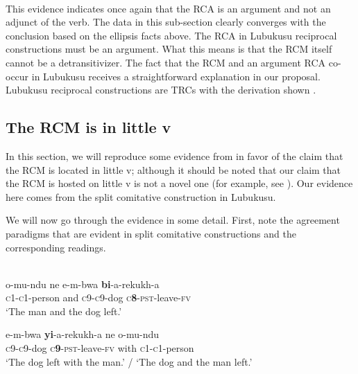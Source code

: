 \documentclass[output=paper]{langsci/langscibook}
\begin{document}
\ea\label{ex:safir:19}
\settowidth{}
  \\
\z
\z
{}
This evidence indicates once again that the RCA is an argument and not an adjunct of the verb. The data in this sub-section clearly converges with the conclusion based on the ellipsis facts above. The RCA in Lubukusu reciprocal constructions must be an argument. What this means is that the RCM itself cannot be a detransitivizer. The fact that the RCM and an argument RCA co-occur in Lubukusu receives a straightforward explanation in our proposal. Lubukusu reciprocal constructions are TRCs with the derivation shown . 

 
\subsection{The RCM is in little v}


In this section, we will reproduce some evidence from \citet{BakerEtAl2013} in favor of the claim that the RCM is located in little v; although it should be noted that our claim that the RCM is hosted on little v is not a novel one (for example, see \citealt{Bruening2006}). Our evidence here comes from the split comitative construction in Lubukusu. 

We will now go through the evidence in some detail. First, note the agreement paradigms that are evident in split comitative constructions and the corresponding readings. 


\ea\label{ex:safir:20}
\\
\ea\label{ex:safir:20a}
\gll   o-mu-ndu        ne   e-m-bwa  \textbf{{bi}}{-a-rekukh-a} \\
       \textsc{c1-c1}-person   and  \textsc{c9-c9}-dog   \textsc{c}\textbf{8}-\textsc{pst}-leave-\textsc{fv} \\
\glt   ‘The man and the dog left.’

\ex\label{ex:safir:20b}
\gll   e-m-bwa  \textbf{{yi}}-a-rekukh-a     ne   o-mu-ndu\\
       \textsc{c9-c9}-dog  \textsc{c}\textbf{9}-\textsc{pst}-leave-\textsc{fv}   with   \textsc{c1-c1}-person\\
\glt   ‘The dog left with the man.’ / ‘The dog and the man left.’
\end{document}

